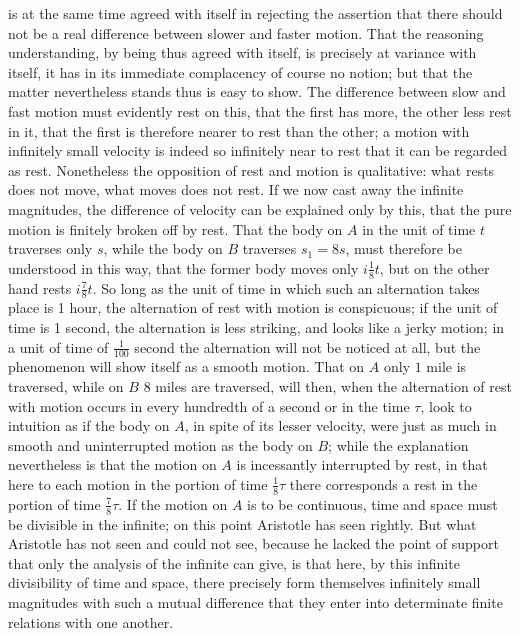 \documentclass[12pt,a4paper,openany]{book}
\newcommand{\opage}[1]{\marginnote{\footnotesize\textit{[#1]}}}
\begin{document}
\opage{144}is at the same time agreed with itself in rejecting the assertion that there should not be a real difference between slower and faster motion. That the reasoning understanding, by being thus agreed with itself, is precisely at variance with itself, it has in its immediate complacency of course no notion; but that the matter nevertheless stands thus is easy to show. The difference between slow and fast motion must evidently rest on this, that the first has more, the other less rest in it, that the first is therefore nearer to rest than the other; a motion with infinitely small velocity is indeed so infinitely near to rest that it can be regarded as rest. Nonetheless the opposition of rest and motion is qualitative: what rests does not move, what moves does not rest. If we now cast away the infinite magnitudes, the difference of velocity can be explained only by this, that the pure motion is finitely broken off by rest. That the body on $A$ in the unit of time $t$ traverses only $s$, while the body on $B$ traverses $s_{1}=8s$, must therefore be understood in this way, that the former body moves only $i \frac{1}{8} t$, but on the other hand rests $i \frac{7}{8} t$. So long as the unit of time in which such an alternation takes place is 1 hour, the alternation of rest with motion is conspicuous; if the unit of time is 1 second, the alternation is less striking, and looks like a jerky motion; in a unit of time of $\frac{1}{100}$ second the alternation will not be noticed at all, but the phenomenon will show itself as a smooth motion. That on $A$ only $1$ mile is traversed, while on $B$ $8$ miles are traversed, will then, when the alternation of rest with motion occurs in every hundredth of a second or in the time $\tau$, look to intuition as if the body on $A$, in spite of its lesser velocity, were just as much in smooth and uninterrupted motion as the body on $B$; while the explanation nevertheless is that the motion on $A$ is incessantly interrupted
\setcounter{footnote}{0}%
\opage{145}by rest, in that here to each motion in the portion of time $\frac{1}{8}\tau$ there corresponds a rest in the portion of time $\frac{7}{8}\tau$. If the motion on $A$ is to be continuous, time and space must be divisible in the infinite; on this point Aristotle has seen rightly. But what Aristotle has not seen and could not see, because he lacked the point of support that only the analysis of the infinite can give, is that here, by this infinite divisibility of time and space, there precisely form themselves infinitely small magnitudes with such a mutual difference that they enter into determinate finite relations with one another.
\end{document}
